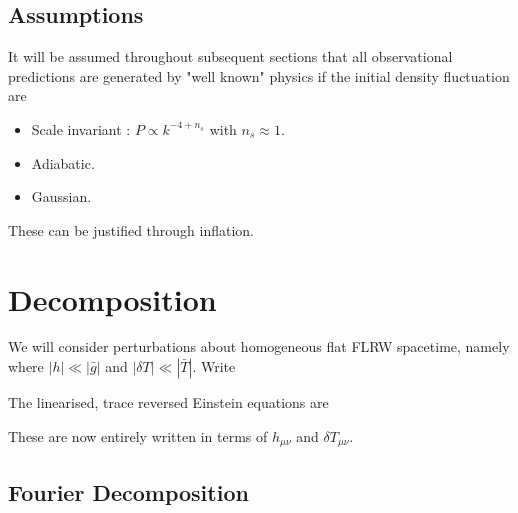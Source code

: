 \documentclass{article}
\begin{document}
\subsection{Assumptions}
It will be assumed throughout subsequent sections that all observational predictions are generated by "well known" physics if the initial density fluctuation are 
\begin{itemize}
    \item Scale invariant : $P \propto k^{-4 + n_s}$ with $n_s \approx 1$. 
    \item Adiabatic. 
    \item Gaussian.
\end{itemize}
These can be justified through inflation. 

\section{Decomposition}
We will consider perturbations about homogeneous flat FLRW spacetime, namely 
where $|h| \ll |\bar{g}|$ and $|\delta T| \ll |\bar{T}|$. Write 

\begin{theorem}
The linearised, trace reversed Einstein equations are 
\end{theorem}

These are now entirely written in terms of $h_{\mu\nu}$ and $\delta T_{\mu\nu}$. 
\subsection{Fourier Decomposition}
\end{document}
